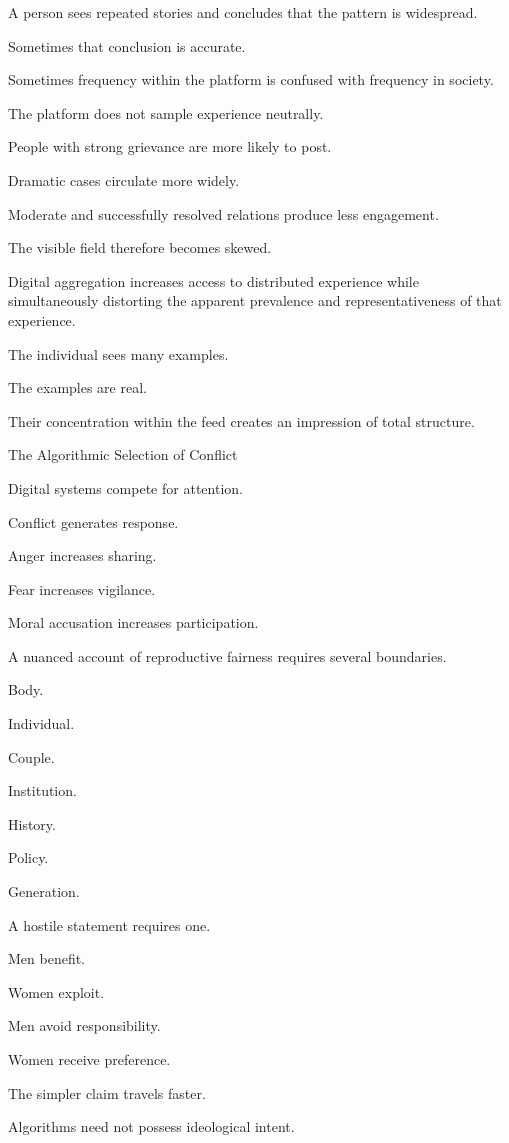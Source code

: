 A person sees repeated stories and concludes that the pattern is widespread.

Sometimes that conclusion is accurate.

Sometimes frequency within the platform is confused with frequency in society.

The platform does not sample experience neutrally.

People with strong grievance are more likely to post.

Dramatic cases circulate more widely.

Moderate and successfully resolved relations produce less engagement.

The visible field therefore becomes skewed.

Digital aggregation increases access to distributed experience while simultaneously distorting the apparent prevalence and representativeness of that experience.

The individual sees many examples.

The examples are real.

Their concentration within the feed creates an impression of total structure.

The Algorithmic Selection of Conflict

Digital systems compete for attention.

Conflict generates response.

Anger increases sharing.

Fear increases vigilance.

Moral accusation increases participation.

A nuanced account of reproductive fairness requires several boundaries.

Body.

Individual.

Couple.

Institution.

History.

Policy.

Generation.

A hostile statement requires one.

Men benefit.

Women exploit.

Men avoid responsibility.

Women receive preference.

The simpler claim travels faster.

Algorithms need not possess ideological intent.

